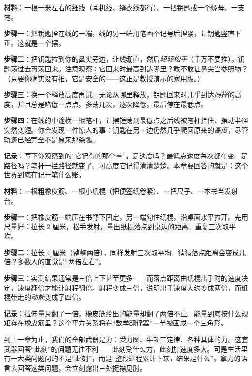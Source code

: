 \begin{experiment}
\textbf{材料}：一根一米左右的细线（耳机线、缝衣线都行）、一把钥匙或一个螺母、一支笔。

\textbf{步骤一}：把钥匙拴在线的一端，线的另一端用笔画个记号后捏紧，让钥匙竖直下垂。这就是一个摆。

\textbf{步骤二}：把钥匙拉到你的鼻尖旁边，让线绷直，然后\emph{轻轻松手}（千万不要推）。钥匙荡过去再荡回来。注意观察：它回来时最高到达哪里？敢不敢让鼻尖当参照物？（只要你确实没有推，它是安全的——这正是教授演示的家用版。）

\textbf{步骤三}：换一个释放高度再试。无论从哪里释放，钥匙回来时几乎到达\emph{同样}的高度，并且总是略低一点点。多荡几次，逐次降低，最后停在最低点。

\textbf{步骤四}：在线的中途横一根笔杆，让摆锤荡到最低点之后线被笔杆拦住、摆动半径突然变短。你会发现一件惊人的事：钥匙在另一边仍然几乎爬回原来的\emph{高度}，尽管轨迹已经完全不是原来那条弧。

\textbf{记录}：写下你观察到的“它记得的那个量”。是速度吗？最低点速度每次都在变。是路径吗？笔杆一拦路径就变了。可高度它记得清清楚楚。本章要回答的就是：这个世界到底在记一笔什么账。
\end{experiment}

\begin{experiment}
\textbf{材料}：一根粗橡皮筋、一根小纸棍（把便签纸卷紧）、一把尺子、一本书当发射台。

\textbf{步骤一}：把橡皮筋一端压在书脊下固定，另一端勾住纸棍，沿桌面水平拉开。先用尺量好：拉长 \(2\) 厘米，松手发射，量出纸棍落点到桌边的距离。重复三次取平均。

\textbf{步骤二}：拉长 \(4\) 厘米（整整两倍），同样发射三次取平均。猜猜落点距离会变成几倍？多数人的直觉是“两倍左右”。

\textbf{步骤三}：实测结果通常是三倍上下甚至更多——而落点距离由纸棍出手时的速度决定，速度翻倍才能让射程翻倍。射程变成三倍，说明出手速度大约变成两倍，而纸棍带走的\emph{动能}变成了四倍。

\textbf{记录}：拉伸量只翻了一倍，橡皮筋给出的能量却翻了两倍不止。能量到底按什么规矩存在橡皮筋里？这个平方关系将在“数学翻译器”一节被画成一个三角形。
\end{experiment}


到上一章为止，我们的全部武器是力：受力图、牛顿三定律、各种具体的力。这套武器回答“此刻”的问题无往不利——此刻受什么力，此刻加速度多大。可是生活里有一大类问题问的不是“此刻”，而是“整段过程累计下来，结果是什么”。拿力的语言去回答这类问题，会立刻露出三处捉襟见肘。

